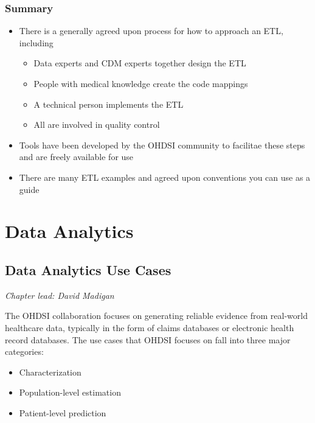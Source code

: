 \documentclass[11pt]{book}
\providecommand{\tightlist}{%
  \setlength{\itemsep}{0pt}\setlength{\parskip}{0pt}}
\theoremstyle{definition}
\theoremstyle{definition}
\theoremstyle{definition}
\theoremstyle{remark}
\let\BeginKnitrBlock\begin \let\EndKnitrBlock\end
\begin{document}
\hypertarget{summary-2}{%
\section{Summary}\label{summary-2}}

\BeginKnitrBlock{rmdsummary}
\begin{itemize}
\item
  There is a generally agreed upon process for how to approach an ETL, including

  \begin{itemize}
  \tightlist
  \item
    Data experts and CDM experts together design the ETL
  \item
    People with medical knowledge create the code mappings
  \item
    A technical person implements the ETL
  \item
    All are involved in quality control
  \end{itemize}
\item
  Tools have been developed by the OHDSI community to facilitae these steps and are freely available for use
\item
  There are many ETL examples and agreed upon conventions you can use as a guide
\end{itemize}
\EndKnitrBlock{rmdsummary}

\hypertarget{part-data-analytics}{%
\part{Data Analytics}\label{part-data-analytics}}

\hypertarget{DataAnalyticsUseCases}{%
\chapter{Data Analytics Use Cases}\label{DataAnalyticsUseCases}}

\emph{Chapter lead: David Madigan}

The OHDSI collaboration focuses on generating reliable evidence from real-world healthcare data, typically in the form of claims databases or electronic health record databases. The use cases that OHDSI focuses on fall into three major categories:

\begin{itemize}
\tightlist
\item
  Characterization
\item
  Population-level estimation
\item
  Patient-level prediction
\end{itemize}
\end{document}
